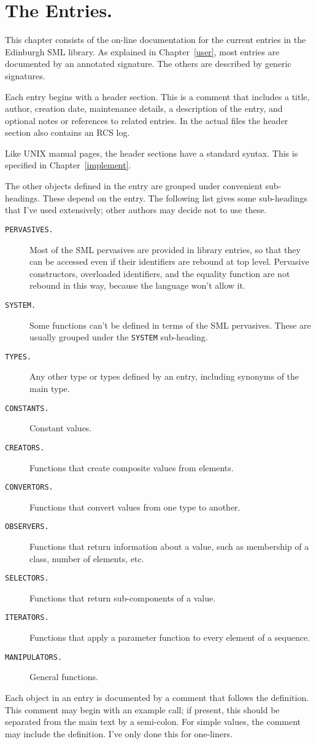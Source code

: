 %
%
%
%

\chapter{The Entries.}		\label{entries}

This chapter consists of the on-line documentation for the current entries in
the Edinburgh SML library.  As explained in Chapter~\ref{user},
most entries are documented by an annotated signature.  The others
are described by generic signatures.

Each entry begins with a header section.  This is a comment that
includes a title, author, creation date, maintenance details, a
description of the entry, and optional notes or references to related
entries.  In the actual files the header section also contains an
RCS log.

Like {\small UNIX} manual pages, the header sections have a standard
syntax.  This is specified in Chapter~\ref{implement}.


The other objects defined in the entry are grouped under convenient
sub-headings.  These depend on the entry.  The following list gives
some sub-headings that I've used extensively; other authors may decide
not to use these.

\begin{description}
  \item[{\small\tt PERVASIVES.}]
	Most of the {\small SML} pervasives are provided in library
	entries, so that they can be accessed even if their identifiers are
	rebound at top level.  Pervasive constructors, overloaded
	identifiers, and the equality function are not rebound in this
	way, because the language won't allow it.
  \item[{\small\tt SYSTEM.}]
	Some functions can't be defined in terms of the {\small SML}
	pervasives.  These are usually grouped under the {\small\tt SYSTEM}
	sub-heading.
  \item[{\small\tt TYPES.}]
	Any other type or types defined by an entry, including synonyms
	of the main type.
  \item[{\small\tt CONSTANTS.}]
	Constant values.
  \item[{\small\tt CREATORS.}]
	Functions that create composite values from elements.
  \item[{\small\tt CONVERTORS.}]
	Functions that convert values from one type to another.
  \item[{\small\tt OBSERVERS.}]
	Functions that return information about a value, such as membership
	of a class, number of elements, etc.
  \item[{\small\tt SELECTORS.}]
	Functions that return sub-components of a value.
  \item[{\small\tt ITERATORS.}]
	Functions that apply a parameter function to every element
	of a sequence.
  \item[{\small\tt MANIPULATORS.}]
	General functions.
\end{description}

Each object in an entry is documented by a comment that follows the
definition.  This comment may begin with an example call; if present,
this should be separated from the main text by a semi-colon.  For
simple values, the comment may include the definition.  I've only done
this for one-liners.


